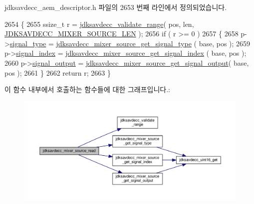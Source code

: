 jdksavdecc\+\_\+aem\+\_\+descriptor.\+h 파일의 2653 번째 라인에서 정의되었습니다.


\begin{DoxyCode}
2654 \{
2655     ssize\_t r = \hyperlink{group__util_ga9c02bdfe76c69163647c3196db7a73a1}{jdksavdecc\_validate\_range}( pos, len, 
      \hyperlink{group__mixer__source_ga19582a125589306c00003f1d783ece52}{JDKSAVDECC\_MIXER\_SOURCE\_LEN} );
2656     \textcolor{keywordflow}{if} ( r >= 0 )
2657     \{
2658         p->\hyperlink{structjdksavdecc__mixer__source_a248e60ef99d5ed1779989d1dd6b6dc5a}{signal\_type} = \hyperlink{group__mixer__source_ga4996aa8dd2c0e86703304f4bbafaf910}{jdksavdecc\_mixer\_source\_get\_signal\_type}
      ( base, pos );
2659         p->\hyperlink{structjdksavdecc__mixer__source_ae2e81a95ee9ad83f1fe22b6a1ee29075}{signal\_index} = \hyperlink{group__mixer__source_ga187ed6716ddc7ac02e90e8119f906e5a}{jdksavdecc\_mixer\_source\_get\_signal\_index}
      ( base, pos );
2660         p->\hyperlink{structjdksavdecc__mixer__source_ab4b91864e6fc335d7e86536d9f4461e4}{signal\_output} = 
      \hyperlink{group__mixer__source_ga73ea63e92337b38da5f5cddfd04cbd46}{jdksavdecc\_mixer\_source\_get\_signal\_output}( base, pos );
2661     \}
2662     \textcolor{keywordflow}{return} r;
2663 \}
\end{DoxyCode}


이 함수 내부에서 호출하는 함수들에 대한 그래프입니다.\+:
\nopagebreak
\begin{figure}[H]
\begin{center}
\leavevmode
\includegraphics[width=350pt]{group__mixer__source_ga90d98b87e2541fc32fcdd305f6fb495d_cgraph}
\end{center}
\end{figure}


